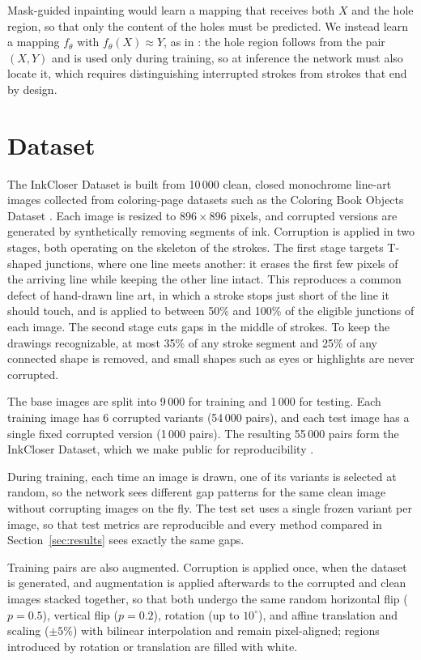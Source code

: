 \documentclass[preprint,12pt]{elsarticle}
\begin{document}
Mask-guided inpainting would learn a mapping that receives both $X$ and the hole
region, so that only the content of the holes must be predicted. We instead learn
a mapping $f_\theta$ with $f_\theta(X) \approx Y$, as in \citet{sasaki2017joint}:
the hole region follows from the pair $(X, Y)$ and is used only during training,
so at inference the network must also locate it, which requires distinguishing
interrupted strokes from strokes that end by design.

\section{Dataset}
\label{sec:dataset}

The InkCloser Dataset is built from 10\,000 clean, closed monochrome line-art images
collected from coloring-page datasets such as the Coloring Book Objects Dataset
\citep{chen2019human}. Each image is resized to $896 \times 896$ pixels, and
corrupted versions are generated by synthetically removing segments of ink.
Corruption is applied in two stages, both operating on the skeleton of the strokes.
The first stage targets T-shaped junctions, where one line meets another: it erases
the first few pixels of the arriving line while keeping the other line intact. This
reproduces a common defect of hand-drawn line art, in which a stroke stops just
short of the line it should touch, and is applied to between 50\% and 100\% of the
eligible junctions of each image. The second stage cuts gaps in the middle of
strokes. To keep the drawings recognizable, at most 35\% of any stroke segment and
25\% of any connected shape is removed, and small shapes such as eyes or highlights
are never corrupted.

The base images are split into 9\,000 for training and 1\,000 for testing. Each
training image has 6 corrupted variants (54\,000 pairs), and each test image has a
single fixed corrupted version (1\,000 pairs). The resulting 55\,000 pairs form the
InkCloser Dataset, which we make public for reproducibility
\citep{datasetInkCloser}.

During training, each time an image is drawn, one of its variants is selected at
random, so the network sees different gap patterns for the same clean image without
corrupting images on the fly. The test set uses a single frozen variant per image,
so that test metrics are reproducible and every method compared in
Section~\ref{sec:results} sees exactly the same gaps.

Training pairs are also augmented. Corruption is applied once, when the dataset is generated, and augmentation is applied afterwards to the corrupted and clean images stacked together, so that both undergo the same random horizontal flip ($p=0.5$), vertical flip ($p=0.2$), rotation (up to $10^{\circ}$), and affine translation and scaling ($\pm 5\%$) with bilinear interpolation and remain pixel-aligned; regions introduced by rotation or translation are filled with white.
\end{document}
